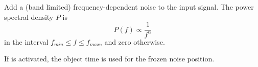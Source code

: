 Add a (band limited) frequency-dependent noise to the input
signal. The power spectral density $P$ is
\begin{equation}
P(f) \propto \frac{1}{f^\alpha}
\end{equation}
in the interval $f_{min} \le f \le f_{max}$, and zero otherwise.



If  is activated, the object time is used for the
frozen noise position.

